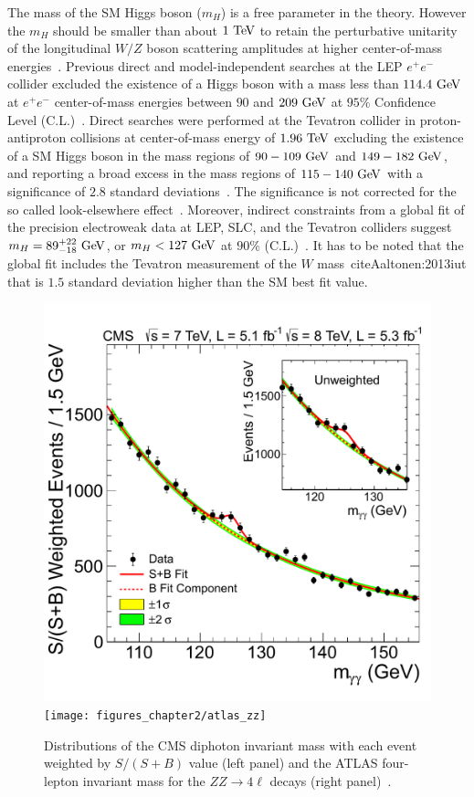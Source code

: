 The mass of the SM Higgs boson ($m_{H}$) is a free parameter in the theory. However the $m_{H}$ should be smaller than about $1~\mathrm{Te\kern -0.1em V}$ to retain the perturbative unitarity of the longitudinal $W/Z$ boson scattering amplitudes at higher center-of-mass energies~\cite{Cornwall:1973tb,Cornwall:1974km,LlewellynSmith:1973yud,Lee:1977eg}.  Previous direct and model-independent searches at the LEP $e^{+}e^{-}$ collider excluded the existence of a Higgs boson with a mass less than $114.4~\mathrm{Ge\kern -0.1em V}$ at $e^+e^-$ center-of-mass energies between $90$ and $209~\mathrm{Ge\kern -0.1em V}$ at $95\%$ Confidence Level (C.L.)~\cite{Barate:2003sz}. Direct searches were performed at the Tevatron collider in proton-antiproton collisions at center-of-mass energy of $1.96~\mathrm{Te\kern -0.1em V}$ excluding the existence of a SM Higgs boson in the mass regions of $90-109~\mathrm{Ge\kern -0.1em V}$ and $149-182~\mathrm{Ge\kern -0.1em V}$, and reporting a broad excess in the mass regions of $115-140~\mathrm{Ge\kern -0.1em V}$ with a significance of $2.8$ standard deviations~\cite{Aaltonen:2013ioz}. The significance is not corrected for the so called look-elsewhere effect~\cite{loook}. Moreover, indirect constraints from a global fit of the precision electroweak data at LEP, SLC, and the Tevatron colliders suggest $m_{H}=89^{+22}_{-18}~\mathrm{Ge\kern -0.1em V}$, or $m_{H}<127~\mathrm{Ge\kern -0.1em V}$ at $90\%$ (C.L.)~\cite{Agashe:2014kda}. It has to be noted that the global fit includes the Tevatron measurement of the $W$ mass~\-cite{Aaltonen:2013iut} that is $1.5$ standard deviation higher than the SM best fit value. 
\begin{figure}[h]
\centering
\includegraphics[width=0.49\columnwidth]{figures_chapter2/gammagamma}
\texttt{[image: figures\_chapter2/atlas\_zz]}
\caption{Distributions of the CMS diphoton invariant mass with each event weighted by $S/(S+B)$ value (left panel) and the ATLAS four-lepton invariant mass for the $ZZ \rightarrow 4 \ell$ decays (right panel)~\cite{Chatrchyan:2012xdj}.}
\label{fig:cms_higgs}
\end{figure}

